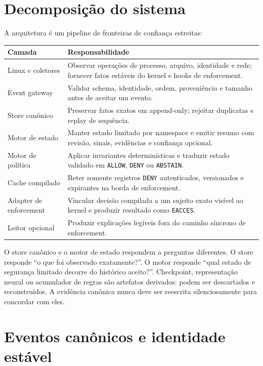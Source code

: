 \documentclass[11pt,a4paper]{article}
\begin{document}
\section{Decomposição do sistema}

A arquitetura é um pipeline de fronteiras de confiança estreitas:

\begin{center}
\begin{tabular}{>{\raggedright\arraybackslash}p{} >{\raggedright\arraybackslash}p{}}
\toprule
Camada & Responsabilidade \\
\midrule
Linux e coletores & Observar operações de processo, arquivo, identidade e rede; fornecer fatos estáveis do kernel e hooks de enforcement. \\
Event gateway & Validar schema, identidade, ordem, proveniência e tamanho antes de aceitar um evento. \\
Store canônico & Preservar fatos exatos em append-only; rejeitar duplicatas e replay de sequência. \\
Motor de estado & Manter estado limitado por namespace e emitir resumo com revisão, sinais, evidências e confiança opcional. \\
Motor de política & Aplicar invariantes determinísticas e traduzir estado validado em \texttt{ALLOW}, \texttt{DENY} ou \texttt{ABSTAIN}. \\
Cache compilado & Reter somente registros \texttt{DENY} autenticados, versionados e expirantes na borda de enforcement. \\
Adapter de enforcement & Vincular decisão compilada a um sujeito exato visível ao kernel e produzir resultado como \texttt{EACCES}. \\
Leitor opcional & Produzir explicações legíveis fora do caminho síncrono de enforcement. \\
\bottomrule
\end{tabular}
\end{center}

O store canônico e o motor de estado respondem a perguntas diferentes. O store
responde ``o que foi observado exatamente?''. O motor responde ``qual estado de
segurança limitado decorre do histórico aceito?''. Checkpoint, representação
neural ou acumulador de regras são artefatos derivados: podem ser descartados e
reconstruídos. A evidência canônica nunca deve ser reescrita silenciosamente para
concordar com eles.

\section{Eventos canônicos e identidade estável}
\end{document}
